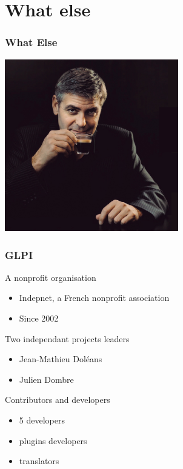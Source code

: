 \documentclass{beamer}
\begin{document}
\section{What else}

\begin{frame}

    \frametitle{What Else}


\includegraphics[height=7.5cm]{./pics/whatelse.jpg}

\end{frame}

\begin{frame}

    \frametitle{GLPI}

    \begin{block}{A nonprofit organisation}
        \begin{itemize}
            \item Indepnet, a French nonprofit association
            \item Since 2002
        \end{itemize}
    \end{block}

    \begin{block}{Two independant projects leaders}
        \begin{itemize}
            \item Jean-Mathieu Doléans
            \item Julien Dombre
        \end{itemize}
    \end{block}

    \begin{block}{Contributors and developers}
        \begin{itemize}
            \item 5 developers
            \item plugins developers
            \item translators
        \end{itemize}
    \end{block}

\end{frame}
\end{document}
